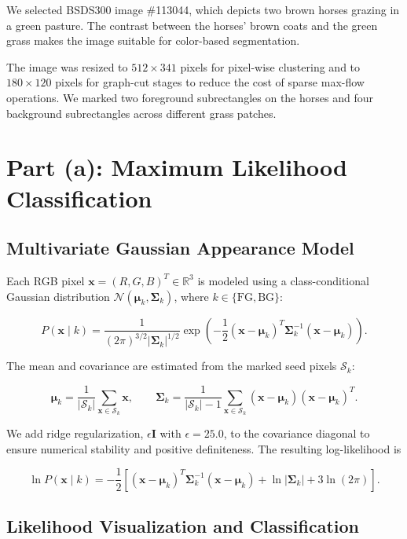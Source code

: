 \documentclass[11pt,a4paper]{article}
\begin{document}
We selected BSDS300 image \#113044, which depicts two brown horses grazing in a green pasture. The contrast between the horses' brown coats and the green grass makes the image suitable for color-based segmentation.

The image was resized to $512 \times 341$ pixels for pixel-wise clustering and to $180 \times 120$ pixels for graph-cut stages to reduce the cost of sparse max-flow operations. We marked two foreground subrectangles on the horses and four background subrectangles across different grass patches.

\section{Part (a): Maximum Likelihood Classification}

\subsection{Multivariate Gaussian Appearance Model}

Each RGB pixel $\mathbf{x}=(R,G,B)^T\in\mathbb{R}^3$ is modeled using a class-conditional Gaussian distribution $\mathcal{N}(\boldsymbol{\mu}_k,\boldsymbol{\Sigma}_k)$, where $k\in\{\text{FG},\text{BG}\}$:

\[
P(\mathbf{x}\mid k)=
\frac{1}{(2\pi)^{3/2}|\boldsymbol{\Sigma}_k|^{1/2}}
\exp\left(
-\frac{1}{2}(\mathbf{x}-\boldsymbol{\mu}_k)^T
\boldsymbol{\Sigma}_k^{-1}(\mathbf{x}-\boldsymbol{\mu}_k)
\right).
\]

The mean and covariance are estimated from the marked seed pixels $\mathcal{S}_k$:

\[
\boldsymbol{\mu}_k=\frac{1}{|\mathcal{S}_k|}
\sum_{\mathbf{x}\in\mathcal{S}_k}\mathbf{x},
\qquad
\boldsymbol{\Sigma}_k=\frac{1}{|\mathcal{S}_k|-1}
\sum_{\mathbf{x}\in\mathcal{S}_k}
(\mathbf{x}-\boldsymbol{\mu}_k)(\mathbf{x}-\boldsymbol{\mu}_k)^T.
\]

We add ridge regularization, $\epsilon\mathbf{I}$ with $\epsilon=25.0$, to the covariance diagonal to ensure numerical stability and positive definiteness. The resulting log-likelihood is

\[
\ln P(\mathbf{x}\mid k)=
-\frac{1}{2}\left[
(\mathbf{x}-\boldsymbol{\mu}_k)^T\boldsymbol{\Sigma}_k^{-1}
(\mathbf{x}-\boldsymbol{\mu}_k)
+\ln|\boldsymbol{\Sigma}_k|+3\ln(2\pi)
\right].
\]

\subsection{Likelihood Visualization and Classification}
\end{document}
